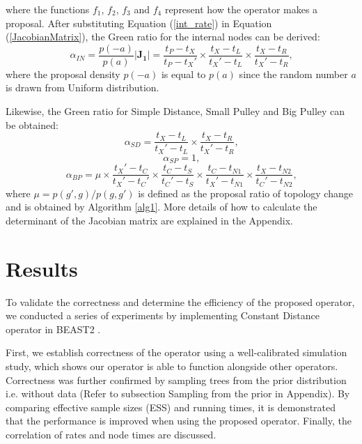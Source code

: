 \documentclass{bmcart}
\begin{document}
where the functions ${f_1}$, ${f_2}$, ${f_3}$ and ${f_4}$ represent how the operator makes a proposal. After substituting Equation (\ref{int_rate}) in Equation (\ref{JacobianMatrix}), the Green ratio for the internal nodes can be derived:
\begin{equation}\label{HR1}
{\alpha_{IN}} = \frac{{p ( - a)}}{{p (a)}}\left| {\mathbf{J_1}} \right| = \frac{{{t_P} - {t_X}}}{{{t_P} - {t_X}'}} \times \frac{{{t_X} - {t_L}}}{{{t_X}' - {t_L}}} \times \frac{{{t_X} - {t_R}}}{{{t_X}' - {t_R}}}\text{,}
\end{equation}
where the proposal density ${p ( - a)}$ is equal to ${p ( a )}$ since the random number $a$ is drawn from Uniform distribution.

Likewise, the Green ratio for Simple Distance, Small Pulley and  Big Pulley can be obtained:
\begin{equation}\label{HR2}
{\alpha_{SD}} = \frac{{{t_X} - {t_L}}}{{{t_X}' - {t_L}}} \times \frac{{{t_X} - {t_R}}}{{{t_X}' - {t_R}}}\text{,}
\end{equation}
\begin{equation}\label{HR3}
{\alpha_{SP}}  = 1\text{,}
\end{equation}
\begin{equation}\label{HR4}
{\alpha_{BP}} = \mu \times \frac{{{t_X}' - {t_C}}}{{{t_X}' - {t_C}'}} \times \frac{{{t_C} - {t_S}}}{{{t_C}' - {t_S}}} \times \frac{{{t_C} - {t_{N1}}}}{{{t_X}' - {t_{N1}}}} \times \frac{{{t_X} - {t_{N2}}}}{{{t_C}' - {t_{N2}}}}\text{,}
\end{equation}
where $\mu = p(g', g) / p(g, g')$ is defined as the proposal ratio of topology change and is obtained by Algorithm \ref{alg1}. More details of how to calculate the determinant of the Jacobian matrix are explained in the Appendix.

\section*{Results}
To validate the correctness and determine the efficiency of the proposed operator, we conducted a series of experiments by implementing Constant Distance operator in BEAST2 \cite{bouckaert2014beast}.

First, we establish correctness of the operator using a well-calibrated simulation study, which shows our operator is able to function alongside other operators. Correctness was further confirmed by sampling trees from the prior distribution i.e. without data (Refer to subsection Sampling from the prior in Appendix). By comparing effective sample sizes (ESS) \cite{Tracer} and running times, it is demonstrated that the performance is improved when using the proposed operator. Finally, the correlation of rates and node times are discussed.
\end{document}
